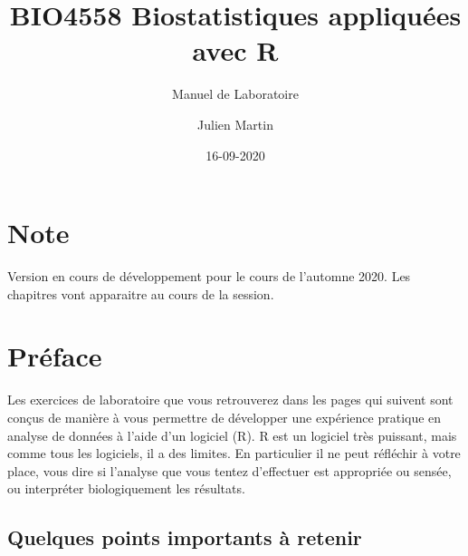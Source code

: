 \documentclass[12pt,]{book}
\title{BIO4558 Biostatistiques appliquées avec R}
\subtitle{Manuel de Laboratoire}
\author{Julien Martin}
\date{16-09-2020}
\begin{document}
\maketitle



{
\setcounter{tocdepth}{1}
\tableofcontents
}
\hypertarget{note}{%
\chapter*{Note}\label{note}}

Version en cours de développement pour le cours de l'automne 2020. Les chapitres vont apparaitre au cours de la session.

\hypertarget{pruxe9face}{%
\chapter*{Préface}\label{pruxe9face}}

Les exercices de laboratoire que vous retrouverez dans les pages qui suivent sont conçus de manière à vous permettre de développer une expérience pratique en analyse de données à l'aide d'un logiciel (R).
R est un logiciel très puissant, mais comme tous les logiciels, il a des limites.
En particulier il ne peut réfléchir à votre place, vous dire si l'analyse que vous tentez d'effectuer est appropriée ou sensée, ou interpréter biologiquement les résultats.

\hypertarget{quelques-points-importants-uxe0-retenir}{%
\section*{Quelques points importants à retenir}\label{quelques-points-importants-uxe0-retenir}}
\end{document}

